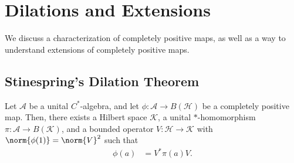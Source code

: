 \documentclass[10pt]{mypackage}
\begin{document}
\section{Dilations and Extensions}%
We discuss a characterization of completely positive maps, as well as a way to understand extensions of completely positive maps.
\subsection{Stinespring's Dilation Theorem}%
\begin{theorem}
  Let $\mathcal{A}$ be a unital $C^{\ast}$-algebra, and let $\phi\colon \mathcal{A}\rightarrow B\left( \mathcal{H} \right)$ be a completely positive map. Then, there exists a Hilbert space $\mathcal{K}$, a unital $\ast$-homomorphism $\pi\colon \mathcal{A}\rightarrow B\left( \mathcal{K} \right)$, and a bounded operator $V\colon \mathcal{H}\rightarrow \mathcal{K}$ with $\norm{\phi(1)} = \norm{V}^2$ such that
  \begin{align*}
    \phi(a) &= V^{\ast}\pi(a)V.
  \end{align*}
\end{theorem}
\end{document}
